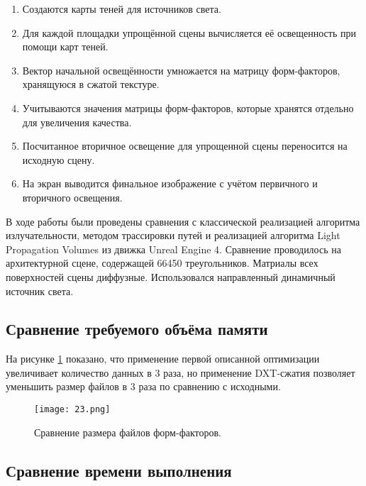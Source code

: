 \documentclass[12pt,fleqn]{article}
\begin{document}
\begin{enumerate}

\item Создаются карты теней для источников света.

\item Для каждой площадки упрощённой сцены вычисляется её освещенность при помощи карт теней.

\item Вектор начальной освещённости умножается на матрицу форм-факторов, хранящуюся в сжатой текстуре.

\item Учитываются значения матрицы форм-факторов, которые хранятся отдельно для увеличения качества.

\item Посчитанное вторичное освещение для упрощенной сцены переносится на исходную сцену.

\item На экран выводится финальное изображение с учётом первичного и вторичного освещения.

\end{enumerate}

В ходе работы были проведены сравнения с классической реализацией алгоритма излучательности, методом трассировки путей и реализацией алгоритма Light Propagation Volumes из движка Unreal Engine 4. Сравнение проводилось на архитектурной сцене, содержащей 66450 треугольников. Матриалы всех поверхностей сцены диффузные. Использовался направленный динамичный источник света.

\subsection{Сравнение требуемого объёма памяти}

На рисунке \ref{size_comparison} показано, что применение первой описанной оптимизации увеличивает количество данных в 3 раза, но применение DXT-сжатия позволяет уменьшить размер файлов в 3 раза по сравнению с исходными.

\begin{figure}[htb]
    \centering
    \texttt{[image: 23.png]}
    \caption{Сравнение размера файлов форм-факторов.}
    \label{size_comparison}
\end{figure}

\subsection{Сравнение времени выполнения}
\end{document}
